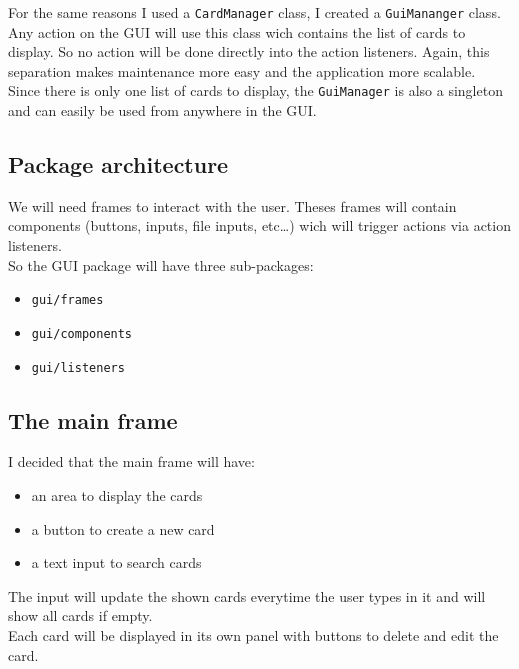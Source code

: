 \documentclass{article}
\begin{document}
For the same reasons I used a \texttt{CardManager} class, I created a
\texttt{GuiMananger} class. Any action on the GUI will use this class
wich contains the list of cards to display. So no action will be done
directly into the action listeners. Again, this separation makes
maintenance more easy and the application more scalable.\\

\noindent
Since there is only one list of cards to display, the
\texttt{GuiManager} is also a singleton and can easily be used from
anywhere in the GUI.

\subsection{Package architecture}

We will need frames to interact with the user. Theses frames will
contain components (buttons, inputs, file inputs, etc\ldots{}) wich will
trigger actions via action listeners.\\So the GUI package will have three
sub-packages:

\begin{itemize}
\itemsep0pt\parskip0pt
\item \texttt{gui/frames}
\item \texttt{gui/components}
\item \texttt{gui/listeners}
\end{itemize}

\newpage
\subsection{The main frame}

I decided that the main frame will have:

\begin{itemize}
\itemsep0pt\parskip0pt
\item an area to display the cards
\item a button to create a new card
\item a text input to search cards
\end{itemize}

\noindent
The input will update the shown cards everytime the user types in it and
will show all cards if empty.\\

\noindent
Each card will be displayed in its own panel with buttons to delete and
edit the card.\\
\end{document}
